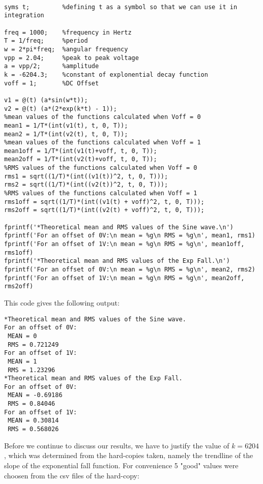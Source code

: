 \documentclass[12pt]{report}
\begin{document}
\begin{verbatim}

syms t;         %defining t as a symbol so that we can use it in integration

freq = 1000;    %frequency in Hertz
T = 1/freq;     %period
w = 2*pi*freq;  %angular frequency 
vpp = 2.04;     %peak to peak voltage
a = vpp/2;      %amplitude
k = -6204.3;    %constant of explonential decay function
voff = 1;       %DC Offset

v1 = @(t) (a*sin(w*t));
v2 = @(t) (a*(2*exp(k*t) - 1));
%mean values of the functions calculated when Voff = 0
mean1 = 1/T*(int(v1(t), t, 0, T));
mean2 = 1/T*(int(v2(t), t, 0, T)); 
%mean values of the functions calculated when Voff = 1
mean1off = 1/T*(int(v1(t)+voff, t, 0, T));            
mean2off = 1/T*(int(v2(t)+voff, t, 0, T));
%RMS values of the functions calculated when Voff = 0
rms1 = sqrt((1/T)*(int((v1(t))^2, t, 0, T)));        
rms2 = sqrt((1/T)*(int((v2(t))^2, t, 0, T)));
%RMS values of the functions calculated when Voff = 1
rms1off = sqrt((1/T)*(int((v1(t) + voff)^2, t, 0, T)));  
rms2off = sqrt((1/T)*(int((v2(t) + voff)^2, t, 0, T)));

fprintf('*Theoretical mean and RMS values of the Sine wave.\n')
fprintf('For an offset of 0V:\n mean = %g\n RMS = %g\n', mean1, rms1)
fprintf('For an offset of 1V:\n mean = %g\n RMS = %g\n', mean1off, rms1off)
fprintf('*Theoretical mean and RMS values of the Exp Fall.\n')
fprintf('For an offset of 0V:\n mean = %g\n RMS = %g\n', mean2, rms2)
fprintf('For an offset of 1V:\n mean = %g\n RMS = %g\n', mean2off, rms2off)
\end{verbatim}
This code gives the following output: 
\begin{verbatim}
*Theoretical mean and RMS values of the Sine wave.
For an offset of 0V:
 MEAN = 0
 RMS = 0.721249
For an offset of 1V:
 MEAN = 1
 RMS = 1.23296
*Theoretical mean and RMS values of the Exp Fall.
For an offset of 0V:
 MEAN = -0.69186
 RMS = 0.84046
For an offset of 1V:
 MEAN = 0.30814
 RMS = 0.568026
\end{verbatim}
Before we continue to discuss our results, we have to justify the value of $k = 6204$, which was determined from the hard-copies taken, namely the trendline of the slope of the exponential fall function. For convenience 5 "good" values were choosen from the csv files of the hard-copy:
\end{document}
